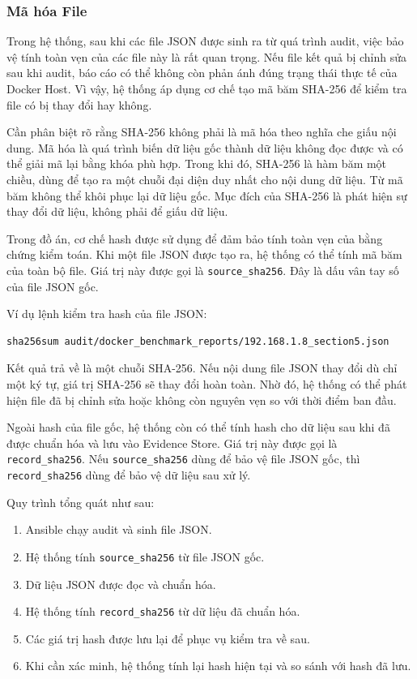 \subsubsection{Mã hóa File}\label{output-ma-hoa-file}

Trong hệ thống, sau khi các file JSON được sinh ra từ quá trình audit, việc bảo vệ tính toàn vẹn của các file này là rất quan trọng. Nếu file kết quả bị chỉnh sửa sau khi audit, báo cáo có thể không còn phản ánh đúng trạng thái thực tế của Docker Host. Vì vậy, hệ thống áp dụng cơ chế tạo mã băm SHA-256 để kiểm tra file có bị thay đổi hay không.

Cần phân biệt rõ rằng SHA-256 không phải là mã hóa theo nghĩa che giấu nội dung. Mã hóa là quá trình biến dữ liệu gốc thành dữ liệu không đọc được và có thể giải mã lại bằng khóa phù hợp. Trong khi đó, SHA-256 là hàm băm một chiều, dùng để tạo ra một chuỗi đại diện duy nhất cho nội dung dữ liệu. Từ mã băm không thể khôi phục lại dữ liệu gốc. Mục đích của SHA-256 là phát hiện sự thay đổi dữ liệu, không phải để giấu dữ liệu.

Trong đồ án, cơ chế hash được sử dụng để đảm bảo tính toàn vẹn của bằng chứng kiểm toán. Khi một file JSON được tạo ra, hệ thống có thể tính mã băm của toàn bộ file. Giá trị này được gọi là \texttt{source\_sha256}. Đây là dấu vân tay số của file JSON gốc.

Ví dụ lệnh kiểm tra hash của file JSON:

\begin{verbatim}
sha256sum audit/docker_benchmark_reports/192.168.1.8_section5.json
\end{verbatim}

Kết quả trả về là một chuỗi SHA-256. Nếu nội dung file JSON thay đổi dù chỉ một ký tự, giá trị SHA-256 sẽ thay đổi hoàn toàn. Nhờ đó, hệ thống có thể phát hiện file đã bị chỉnh sửa hoặc không còn nguyên vẹn so với thời điểm ban đầu.

Ngoài hash của file gốc, hệ thống còn có thể tính hash cho dữ liệu sau khi đã được chuẩn hóa và lưu vào Evidence Store. Giá trị này được gọi là \texttt{record\_sha256}. Nếu \texttt{source\_sha256} dùng để bảo vệ file JSON gốc, thì \texttt{record\_sha256} dùng để bảo vệ dữ liệu sau xử lý.

Quy trình tổng quát như sau:

\begin{enumerate}
\item Ansible chạy audit và sinh file JSON.
\item Hệ thống tính \texttt{source\_sha256} từ file JSON gốc.
\item Dữ liệu JSON được đọc và chuẩn hóa.
\item Hệ thống tính \texttt{record\_sha256} từ dữ liệu đã chuẩn hóa.
\item Các giá trị hash được lưu lại để phục vụ kiểm tra về sau.
\item Khi cần xác minh, hệ thống tính lại hash hiện tại và so sánh với hash đã lưu.
\end{enumerate}

